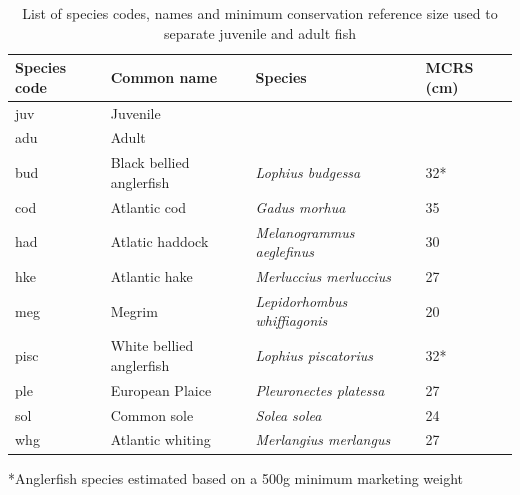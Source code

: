 \documentclass{article}
\begin{document}
\begin{table}
	\caption{List of species codes, names and minimum conservation
		reference size used to separate juvenile and adult fish}
	\center
	\begin{tabular}{ p{3cm} p{4cm} p{6cm} p{2cm} }
		\hline
		Species code & Common name              & Species & MCRS (cm) \\
		\hline
		juv          & Juvenile                 & \\
		adu          & Adult                    & \\
		\hline
		bud          & Black bellied anglerfish & \textit{Lophius
			budgessa} &  32* \\
		cod          & Atlantic cod             & \textit{Gadus morhua}
		& 35 \\
		had          & Atlatic haddock          & \textit{Melanogrammus
			aeglefinus} & 30 \\
		hke          & Atlantic hake            & \textit{Merluccius
			merluccius} & 27 \\
		meg          & Megrim                   & \textit{Lepidorhombus
			whiffiagonis} & 20 \\
		pisc         & White bellied anglerfish & \textit{Lophius
			piscatorius}	& 32* \\
		ple          & European Plaice          & \textit{Pleuronectes
			platessa} & 27 \\
		sol          & Common sole              & \textit{Solea solea}
		& 24 \\
		whg          & Atlantic whiting         & \textit{Merlangius
			merlangus} & 27 \\
		\hline
	\end{tabular}
	*Anglerfish species estimated based on a 500g minimum marketing weight

\end{table}
\end{document}
